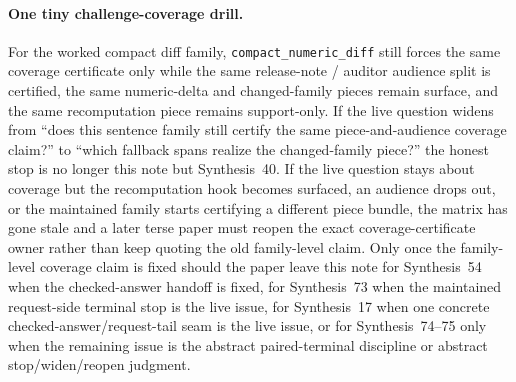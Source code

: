 \documentclass[11pt]{article}
\begin{document}
\paragraph{One tiny challenge-coverage drill.}
For the worked compact diff family, \nolinkurl{compact_numeric_diff} still forces the same coverage certificate only while the same release-note / auditor audience split is certified, the same numeric-delta and changed-family pieces remain \textsf{surface}, and the same recomputation piece remains \textsf{support-only}. If the live question widens from ``does this sentence family still certify the same piece-and-audience coverage claim?'' to ``which fallback spans realize the changed-family piece?'' the honest stop is no longer this note but Synthesis~40. If the live question stays about coverage but the recomputation hook becomes surfaced, an audience drops out, or the maintained family starts certifying a different piece bundle, the matrix has gone stale and a later terse paper must reopen the exact coverage-certificate owner rather than keep quoting the old family-level claim. Only once the family-level coverage claim is fixed should the paper leave this note for Synthesis~54 when the checked-answer handoff is fixed, for Synthesis~73 when the maintained request-side terminal stop is the live issue, for Synthesis~17 when one concrete checked-answer/request-tail seam is the live issue, or for Synthesis~74--75 only when the remaining issue is the abstract paired-terminal discipline or abstract stop/widen/reopen judgment.\cite{series:workedexample}
\end{document}
